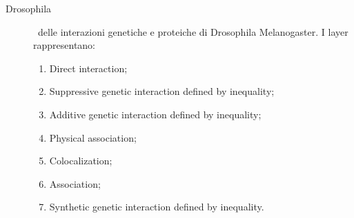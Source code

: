 \begin{description}
    \item[Drosophila] \mulx\ delle interazioni genetiche e proteiche di 
    Drosophila Melanogaster. I layer rappresentano:
    \begin{enumerate}
        \item Direct interaction;
        \item Suppressive genetic interaction defined by inequality;
        \item Additive genetic interaction defined by inequality;
        \item Physical association;
        \item Colocalization;
        \item Association;
        \item Synthetic genetic interaction defined by inequality.
    \end{enumerate} 
    

\end{description}
